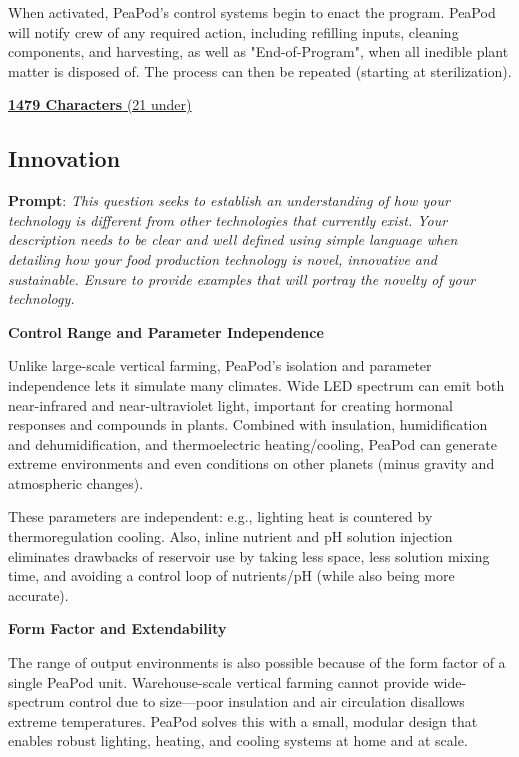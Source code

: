 \documentclass{report}
\begin{document}
When activated, PeaPod's control systems begin to enact the program. PeaPod will notify crew of any required action, including refilling inputs, cleaning components, and harvesting, as well as "End-of-Program", when all inedible plant matter is disposed of. The process can then be repeated (starting at sterilization).

\uline{\textbf{1479 Characters} (21 under)}

\subsection{Innovation}
\label{sec:innovation}

\textbf{Prompt}: \textit{This question seeks to establish an understanding of how your technology is different from other technologies that currently exist. Your description needs to be clear and well defined using simple language when detailing how your food production technology is novel, innovative and sustainable. Ensure to provide examples that will portray the novelty of your technology.}


\textbf{Control Range and Parameter Independence}

Unlike large-scale vertical farming, PeaPod’s isolation and parameter independence lets it simulate many climates. Wide LED spectrum can emit both near-infrared and near-ultraviolet light, important for creating hormonal responses and compounds in plants. Combined with insulation, humidification and dehumidification, and thermoelectric heating/cooling, PeaPod can generate extreme environments and even conditions on other planets (minus gravity and atmospheric changes). 

These parameters are independent: e.g., lighting heat is countered by thermoregulation cooling. Also, inline nutrient and pH solution injection eliminates drawbacks of reservoir use by taking less space, less solution mixing time, and avoiding a control loop of nutrients/pH (while also being more accurate).


\textbf{Form Factor and Extendability}

The range of output environments is also possible because of the form factor of a single PeaPod unit. Warehouse-scale vertical farming cannot provide wide-spectrum control due to size---poor insulation and air circulation disallows extreme temperatures. PeaPod solves this with a small, modular design that enables robust lighting, heating, and cooling systems at home and at scale.
\end{document}
